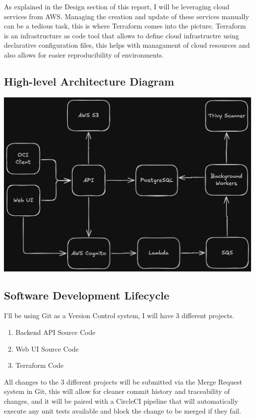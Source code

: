 \documentclass{article}
\begin{document}
  As explained in the Design section of this report, I will be leveraging cloud services from AWS.
  Managing the creation and update of these services manually can be a tedious task, this is where Terraform comes into the picture. Terraform is an infrastructure as code tool that allows to define cloud infrastructre using declarative configuration files, this helps with managament of cloud resources and also allows for easier reproducibility of environments.

  \subsection{High-level Architecture Diagram}

  \includegraphics[scale=0.25]{architecture.png}

  \subsection{Software Development Lifecycle}
  I'll be using Git as a Version Control system, I will have 3 different projects.

  \begin{enumerate}
    \item Backend API Source Code
    \item Web UI Source Code
    \item Terraform Code
  \end{enumerate}

  All changes to the 3 different projects will be submitted via the Merge Request system in Git, this will allow for cleaner commit history and traceability of changes, and it will be paired with a CircleCI pipeline that will automatically execute any unit tests available and block the change to be merged if they fail.
  
\end{document}
